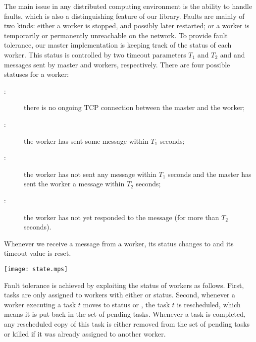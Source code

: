 \documentclass[a4paper,12pt]{article}
\begin{document}
The main issue in any distributed computing environment is the ability
to handle faults, which is also a distinguishing feature of our
library.  Faults are mainly of two kinds: either a worker is stopped,
and possibly later restarted; or a worker is temporarily or
permanently unreachable on the network. To provide fault tolerance,
our master implementation is keeping track of the status of each
worker.  This status is controlled by two timeout parameters $T_1$ and
$T_2$ and  and  messages sent by master and workers,
respectively. There are four possible statuses for a worker:
\begin{description}
\item[:] there is no ongoing TCP connection between
  the master and the worker;
\item[:] the worker has sent some message
  within $T_1$ seconds;
\item[:] the worker has not sent any message within $T_1$
  seconds and the master has sent the worker a
   message within $T_2$ seconds;
\item[:] the worker has not yet responded to the 
  message (for more than $T_2$ seconds).
\end{description}
Whenever we receive a message from a worker, its status changes to
 and its timeout value is reset.
\begin{center}
  \texttt{[image: state.mps]}
\end{center}

Fault tolerance is achieved by exploiting the status of workers as
follows. First, tasks are only assigned to workers with either
 or  status. Second, whenever a worker executing
a task $t$ moves to status  or , the
task $t$ is rescheduled, which means it is put back in the set of
pending tasks. Whenever a task is completed, any rescheduled copy of
this task is either removed from the set of pending tasks or killed if
it was already assigned to another worker.
\end{document}
